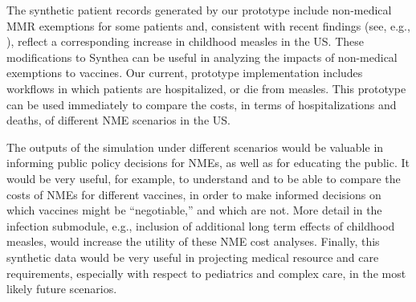 \documentclass[12pt]{article}
\begin{document}
The synthetic patient records generated by our prototype include non-medical MMR exemptions for some patients and, consistent with recent findings (see, e.g., \cite{arvil-vaccine-exemptions}), reflect a corresponding increase in childhood measles in the US.  These modifications to Synthea can be useful in analyzing the impacts of non-medical exemptions to vaccines.  Our current, prototype implementation includes workflows in which patients are hospitalized, or die from measles.  This prototype can be used immediately to compare the costs, in terms of hospitalizations and deaths, of different NME scenarios in the US.

The outputs of the simulation under different scenarios would be valuable in informing public policy decisions for NMEs, as well as for educating the public.  It would be very useful, for example, to understand and to be able to compare the costs of NMEs for different vaccines, in order to make informed decisions on which vaccines might be ``negotiable,'' and which are not.  More detail in the infection submodule, e.g., inclusion of additional long term effects of childhood measles, would increase the utility of these NME cost analyses.  Finally, this synthetic data would be very useful in projecting medical resource and care requirements, especially with respect to pediatrics and complex care, in the most likely future scenarios.

\clearpage






\end{document}
